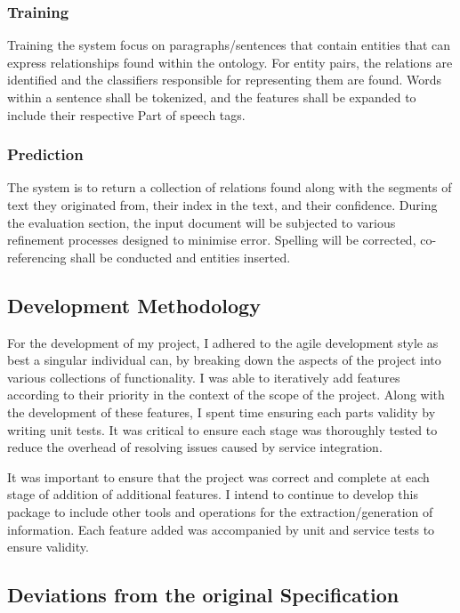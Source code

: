 \documentclass[11pt]{article} %
\begin{document}
\subsubsection{Training}

Training the system focus on paragraphs/sentences that contain entities that can express relationships found within the ontology. For entity pairs, the relations are identified and the classifiers responsible for representing them are found. Words within a sentence shall be tokenized, and the features shall be expanded to include their respective Part of speech tags.

\subsubsection{Prediction}

The system is to return a collection of relations found along with the  segments of text they originated from, their index in the text, and their confidence. During the evaluation section, the input document will be subjected to various refinement processes designed to minimise error. Spelling will be corrected, co-referencing shall be conducted and entities inserted.

\subsection{Development Methodology}

For the development of my project, I adhered to the agile development style as best a singular individual can, by breaking down the aspects of the project into various collections of functionality. I was able to iteratively add features according to their priority in the context of the scope of the project. Along with the development of these features, I spent time ensuring each parts validity by writing unit tests. It was critical to ensure each stage was thoroughly tested to reduce the overhead of resolving issues caused by service integration.

It was important to ensure that the project was correct and complete at each stage of addition of additional features. I intend to continue to develop this package to include other tools and operations for the extraction/generation of information. Each feature added was accompanied by unit and service tests to ensure validity.

\subsection{Deviations from the original Specification}
\end{document}
